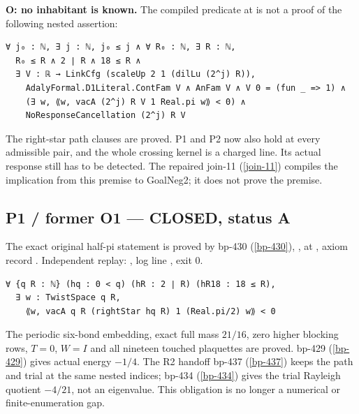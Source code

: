 \begin{theorem}
\label{open-cofinal}
\textbf{O: no inhabitant is known.} The compiled predicate at \texttt{} is not a proof of the following nested assertion:

\begin{verbatim}
∀ j₀ : ℕ, ∃ j : ℕ, j₀ ≤ j ∧ ∀ R₀ : ℕ, ∃ R : ℕ,
  R₀ ≤ R ∧ 2 ∣ R ∧ 18 ≤ R ∧
  ∃ V : ℝ → LinkCfg (scaleUp 2 1 (dilLu (2^j) R)),
    AdalyFormal.D1Literal.ContFam V ∧ AnFam V ∧ V 0 = (fun _ => 1) ∧
    (∃ w, ⟪w, vacA (2^j) R V 1 Real.pi w⟫ < 0) ∧
    NoResponseCancellation (2^j) R V
\end{verbatim}

The right-star path clauses are proved. P1 and P2 now also hold at every admissible pair, and the whole crossing kernel is a charged line. Its actual response still has to be detected. The repaired join-11 (\ref{join-11}) compiles the implication from this premise to GoalNeg2; it does not prove the premise.

\end{theorem}

\subsection{P1 / former O1 — CLOSED, status A}
\label{open-negative}
The exact original half-pi statement is proved by bp-430 (\ref{bp-430}), \texttt{}, at \texttt{}, axiom record \texttt{}. Independent replay: \texttt{}, log line \texttt{}, exit 0.

\begin{verbatim}
∀ {q R : ℕ} (hq : 0 < q) (hR : 2 ∣ R) (hR18 : 18 ≤ R),
  ∃ w : TwistSpace q R,
    ⟪w, vacA q R (rightStar hq R) 1 (Real.pi/2) w⟫ < 0
\end{verbatim}

The periodic six-bond embedding, exact full mass \(21/16\), zero higher blocking rows, \(T=0\), \(W=I\) and all nineteen touched plaquettes are proved. bp-429 (\ref{bp-429}) gives actual energy \(-1/4\). The R2 handoff bp-437 (\ref{bp-437}) keeps the path and trial at the same nested indices; bp-434 (\ref{bp-434}) gives the trial Rayleigh quotient \(-4/21\), not an eigenvalue. This obligation is no longer a numerical or finite-enumeration gap.

